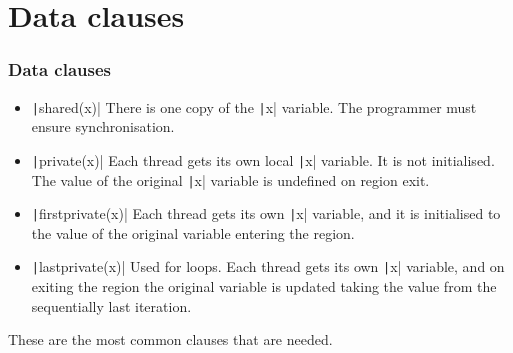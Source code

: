 \documentclass{beamer}
\begin{document}
\section{Data clauses}
\begin{frame}
\frametitle{Data clauses}
\begin{itemize}
  \item \texttt|shared(x)|
    There is one copy of the \texttt|x| variable. The programmer must ensure synchronisation.
  \item \texttt|private(x)|
    Each thread gets its own local \texttt|x| variable. It is not initialised. The value of the original \texttt|x| variable is undefined on region exit.
  \item \texttt|firstprivate(x)|
    Each thread gets its own \texttt|x| variable, and it is initialised to the value of the original variable entering the region.
  \item \texttt|lastprivate(x)|
    Used for loops. Each thread gets its own \texttt|x| variable, and on exiting the region the original variable is updated taking the value from the sequentially last iteration.
\end{itemize}

These are the most common clauses that are needed.
\end{frame}

%
%
\end{document}
